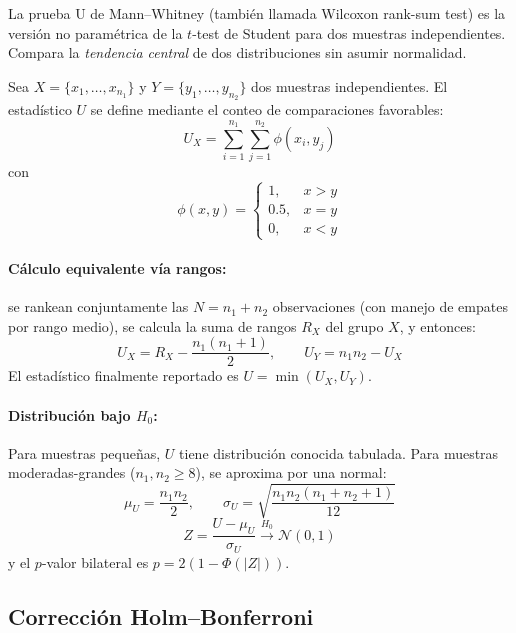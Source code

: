 \documentclass[12pt,a4paper,oneside]{book}
\begin{document}
La prueba U de Mann--Whitney (también llamada Wilcoxon rank-sum test) es la versión no paramétrica de la $t$-test de Student para dos muestras independientes. Compara la \emph{tendencia central} de dos distribuciones sin asumir normalidad.

Sea $X = \{x_1, \ldots, x_{n_1}\}$ y $Y = \{y_1, \ldots, y_{n_2}\}$ dos muestras independientes. El estadístico $U$ se define mediante el conteo de comparaciones favorables:
\begin{equation}
U_X = \sum_{i=1}^{n_1}\sum_{j=1}^{n_2} \phi(x_i, y_j)
\end{equation}
con
\begin{equation}
\phi(x,y) = \begin{cases}
1, & x>y\\
0.5, & x=y\\
0, & x<y
\end{cases}
\end{equation}

\paragraph{Cálculo equivalente vía rangos:} se rankean conjuntamente las $N=n_1+n_2$ observaciones (con manejo de empates por rango medio), se calcula la suma de rangos $R_X$ del grupo $X$, y entonces:
\begin{equation}
U_X = R_X - \frac{n_1(n_1+1)}{2}, \qquad U_Y = n_1 n_2 - U_X
\end{equation}
El estadístico finalmente reportado es $U = \min(U_X, U_Y)$.

\paragraph{Distribución bajo $H_0$:} Para muestras pequeñas, $U$ tiene distribución conocida tabulada. Para muestras moderadas-grandes ($n_1, n_2 \geq 8$), se aproxima por una normal:
\begin{equation}
\mu_U = \frac{n_1 n_2}{2}, \qquad \sigma_U = \sqrt{\frac{n_1 n_2 (n_1+n_2+1)}{12}}
\end{equation}
\begin{equation}
Z = \frac{U - \mu_U}{\sigma_U} \xrightarrow{H_0} \mathcal{N}(0,1)
\end{equation}
y el $p$-valor bilateral es $p = 2(1 - \Phi(|Z|))$.

\subsection{Corrección Holm--Bonferroni}
\end{document}
